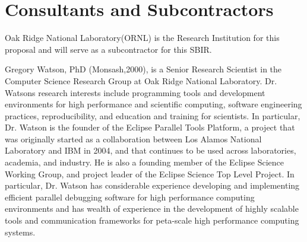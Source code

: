 \section{Consultants and Subcontractors}
Oak Ridge National Laboratory(ORNL) is the Research Institution for this proposal and will serve as a subcontractor for this SBIR. 

Gregory Watson, PhD (Monsash,2000), is a Senior Research Scientist in the Computer Science Research Group at Oak Ridge National Laboratory. Dr. Watsons research interests include programming tools and development environments for high performance and scientific computing, software engineering practices, reproducibility, and education and training for scientists. In particular, Dr. Watson is the founder of the Eclipse Parallel Tools Platform, a project that was originally started as a collaboration between Los Alamos National Laboratory and IBM in 2004, and that continues to be used across laboratories, academia, and industry. He is also a founding member of the Eclipse Science Working Group, and project leader of the Eclipse Science Top Level Project. In particular, Dr. Watson has considerable experience developing and implementing efficient parallel debugging software for high performance computing environments \cite{} and has wealth of experience in the development of highly scalable tools and communication frameworks for peta-scale high performance computing systems.
